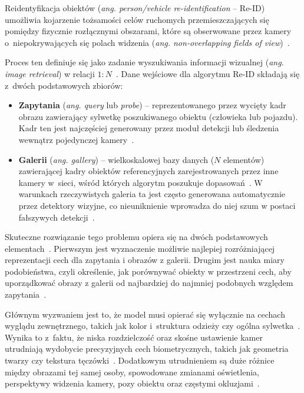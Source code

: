 Reidentyfikacja obiektów (\textit{ang. person/vehicle re-identification} -- Re-ID) umożliwia
kojarzenie tożsamości celów ruchomych przemieszczających się pomiędzy fizycznie rozłącznymi
obszarami, które są obserwowane przez kamery o~niepokrywających się polach widzenia (\textit{ang.
  non-overlapping fields of view})~\cite{ristani2016, zheng2016person}.

Proces ten definiuje się jako zadanie wyszukiwania informacji wizualnej (\textit{ang. image
  retrieval}) w relacji $1:N$~\cite{zheng2016person, zheng2017wild}. Dane wejściowe dla algorytmu
Re-ID składają się z~dwóch podstawowych zbiorów:
\begin{itemize}
  \item \textbf{Zapytania} (\textit{ang. query} lub \textit{probe}) -- reprezentowanego przez wycięty kadr obrazu zawierający sylwetkę poszukiwanego obiektu
        (człowieka lub pojazdu). Kadr ten jest najczęściej generowany przez moduł detekcji lub śledzenia wewnątrz pojedynczej kamery~\cite{ristani2016, zheng2016person}.
  \item \textbf{Galerii} (\textit{ang. gallery}) -- wielkoskalowej bazy danych ($N$ elementów) zawierającej kadry obiektów referencyjnych
        zarejestrowanych przez inne kamery w~sieci, wśród których algorytm poszukuje dopasowań~\cite{zheng2016person}. W warunkach rzeczywistych galeria ta jest
        często generowana automatycznie przez detektory wizyjne, co nieuniknienie wprowadza do niej szum w postaci fałszywych detekcji~\cite{zheng2017wild}.
\end{itemize}

Skuteczne rozwiązanie tego problemu opiera się na dwóch podstawowych elementach~\cite{liao2015}.
Pierwszym jest wyznaczenie możliwie najlepiej rozróżniającej reprezentacji cech dla zapytania i
obrazów z galerii. Drugim jest nauka miary podobieństwa, czyli określenie, jak porównywać obiekty w
przestrzeni cech, aby uporządkować obrazy z galerii od najbardziej do najmniej podobnych względem
zapytania~\cite{liao2015, zheng2016person}.

Głównym wyzwaniem jest to, że model musi opierać się wyłącznie na cechach wyglądu zewnętrznego,
takich jak kolor i~struktura odzieży czy ogólna sylwetka~\cite{rao2023}. Wynika to z~faktu, że
niska rozdzielczość oraz skośne ustawienie kamer utrudniają wydobycie precyzyjnych cech
biometrycznych, takich jak geometria twarzy czy tekstura tęczówki~\cite{ristani2016,
  zheng2017wild}. Dodatkowym utrudnieniem są duże różnice między obrazami tej samej osoby,
spowodowane zmianami oświetlenia, perspektywy widzenia kamery, pozy obiektu oraz częstymi
okluzjami~\cite{liao2015, zheng2017wild}.

